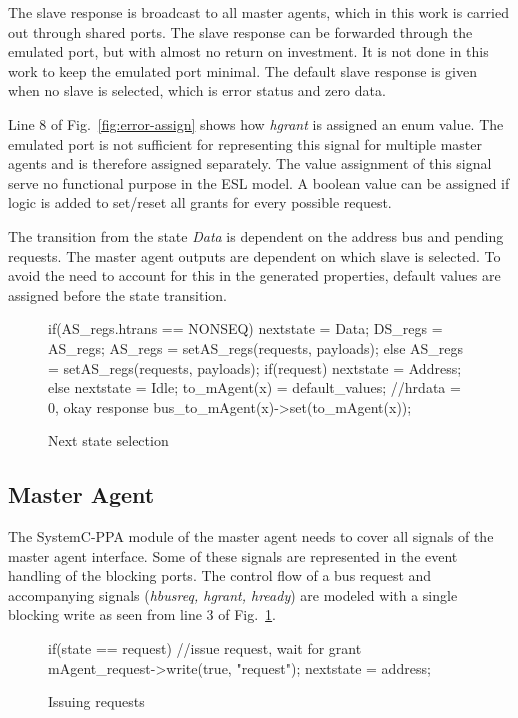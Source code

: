 The slave response is broadcast to all master agents, which in this work is carried out through shared ports. The slave response can be forwarded through the emulated port, but with almost no return on investment. It is not done in this work to keep the emulated port minimal. The default slave response is given when no slave is selected, which is error status and zero data. \par
Line 8 of Fig.~\ref{fig:error-assign} shows how \textit{hgrant} is assigned an enum value. The emulated port is not sufficient for representing this signal for multiple master agents and is therefore assigned separately. The value assignment of this signal serve no functional purpose in the ESL model. A boolean value can be assigned if logic is added to set/reset all grants for every possible request.  \par
The transition from the state \textit{Data} is dependent on the address bus and pending requests. The master agent outputs are dependent on which slave is selected. To avoid the need to account for this in the generated properties, default values are assigned before the state transition. 
\begin{figure}[h!]  
\begin{C++}
if(AS_regs.htrans == NONSEQ){ 
 nextstate = Data;
 DS_regs = AS_regs;
 AS_regs = setAS_regs(requests, payloads); 
}else{
 AS_regs = setAS_regs(requests, payloads); 
 if(request) nextstate = Address;
 else nextstate = Idle;
}
to_mAgent(x) = default_values; //hrdata = 0, okay response
bus_to_mAgent(x)->set(to_mAgent(x));
\end{C++}
\caption{Next state selection}
\end{figure}

\newpage

\subsection{Master Agent}
\label{sub:magent-design}
The SystemC-PPA module of the master agent needs to cover all signals of the master agent interface. Some of these signals are represented in the event handling of the blocking ports. The control flow of a bus request and accompanying signals (\textit{hbusreq, hgrant, hready}) are modeled with a single blocking write as seen from line 3 of Fig.~\ref {fig:request-code}.
\begin{figure}[h!] 
\begin{C++}
if(state == request){
  //issue request, wait for grant
  mAgent_request->write(true, "request"); 
  nextstate = address;
}
\end{C++}
\caption{Issuing requests}
\label{fig:request-code}
\end{figure}

